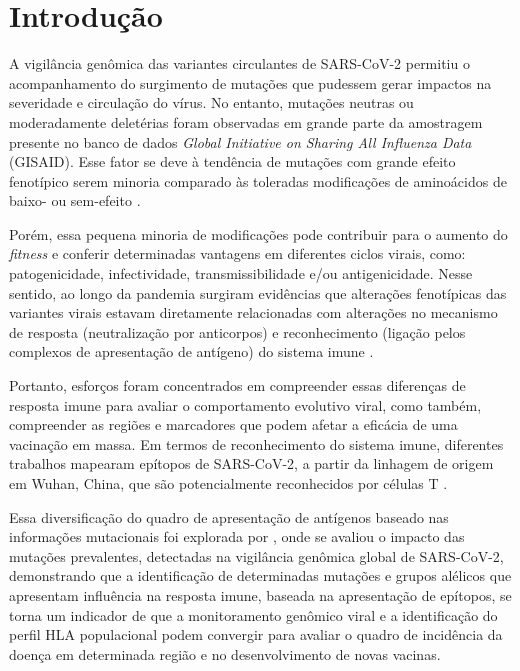 \chapter{Introdução}
\begin{justify}

\hspace{12 mm}A vigilância genômica das variantes circulantes de SARS-CoV-2 permitiu o acompanhamento do surgimento de mutações que pudessem gerar impactos na severidade e circulação do vírus. No entanto, mutações neutras ou moderadamente deletérias foram observadas em grande parte da amostragem presente no banco de dados \textit{Global Initiative on Sharing All Influenza Data} (GISAID). Esse fator se deve à tendência de mutações com grande efeito fenotípico serem minoria comparado às toleradas modificações de aminoácidos de baixo- ou sem-efeito \cite{Harvey:2021}.

Porém, essa pequena minoria de modificações pode contribuir para o aumento do \textit{fitness} e conferir determinadas vantagens em diferentes ciclos virais, como: patogenicidade, infectividade, transmissibilidade e/ou antigenicidade. Nesse sentido, ao longo da pandemia surgiram evidências que alterações fenotípicas das variantes virais estavam diretamente relacionadas com alterações no mecanismo de resposta (neutralização por anticorpos) e reconhecimento (ligação pelos complexos de apresentação de antígeno) do sistema imune \cite{Harvey:2021, Pontarotti:2022}.

Portanto, esforços foram concentrados em compreender essas diferenças de resposta imune para avaliar o comportamento evolutivo viral, como também, compreender as regiões e marcadores que podem afetar a eficácia de uma vacinação em massa. Em termos de reconhecimento do sistema imune, diferentes trabalhos mapearam epítopos de SARS-CoV-2, a partir da linhagem de origem em Wuhan, China,  que são potencialmente reconhecidos por células T \cite{Grifoni:2020, Kiyotani:2020}.

Essa diversificação do quadro de apresentação de antígenos baseado nas informações mutacionais foi explorada por , onde se avaliou o impacto das mutações prevalentes, detectadas na vigilância genômica global de SARS-CoV-2, demonstrando que a identificação de determinadas mutações e grupos alélicos que apresentam influência na resposta imune, baseada na apresentação de epítopos, se torna um indicador de que a monitoramento genômico viral e a identificação do perfil HLA populacional podem convergir para avaliar o quadro de incidência da doença em determinada região e no desenvolvimento de novas vacinas.


\end{justify}
